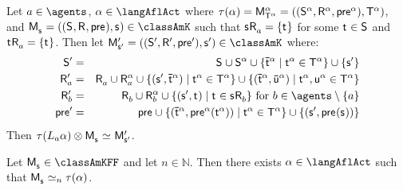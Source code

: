 \begin{lemma}\label{afl-kff-construction-learning}
Let $\agentA \in \agents$, $\alpha \in \langAflAct$ where $\tau(\alpha) = \aPModel[\alpha]{\aStatesT[\alpha]} = \aPModelTuple[\alpha]{\aStatesT[\alpha]}$, and $\aPModel{\aStateS} = \aPModelTuple{\aStateS} \in \classAmK$ such that $\aStateS \aAccessibility{\agentA} = \{\aStateT\}$ for some $\aStateT \in \aStates$ and $\aStateT \aAccessibility{\agentA} = \{\aStateT\}$.
Then let $\aPModel[\prime]{\aStateS[\prime]} = \aPModelTuple[\prime]{\aStateS[\prime]} \in \classAmK$ where:
\begin{eqnarray*}
    \aStates[\prime] &=& \aStates \cup \aStates[\alpha] \cup \{\aPStateT[\alpha] \mid \aStateT[\alpha] \in \aStatesT[\alpha]\} \cup \{\aStateS[\prime]\}\\
    \aAccessibility[\prime]{\agentA} &=& \aAccessibility{\agentA} \cup \aAccessibility[\alpha]{\agentA} \cup \{(\aStateS[\prime], \aPStateT[\alpha]) \mid \aStateT[\alpha] \in \aStatesT[\alpha]\} \cup \{(\aPStateT[\alpha], \aPStateU[\alpha]) \mid \aStateT[\alpha], \aStateU[\alpha] \in \aStatesT[\alpha]\}\\
    \aAccessibility[\prime]{\agentB} &=& \aAccessibility{\agentB} \cup \aAccessibility[\alpha]{\agentB} \cup \{(\aStateS[\prime], \aStateT) \mid \aStateT \in \aStateS \aAccessibility{\agentB}\} \text{ for } \agentB \in \agents \setminus \{\agentA\}\\
    \aPrecondition[\prime] &=& \aPrecondition \cup \{(\aPStateT[\alpha], \aPrecondition[\alpha](\aStateT[\alpha])) \mid \aStateT[\alpha] \in \aStatesT[\alpha]\} \cup \{(\aStateS[\prime], \aPrecondition(\aStateS))\}
\end{eqnarray*}
Then $\tau(\learns_\agentA \alpha) \exec \aPModel{\aStateS} \bisimilar \aPModel[\prime]{\aStateS[\prime]}$.
\end{lemma}

\begin{proposition}\label{afl-kff-correspondence}
Let $\aPModel{\aStateS} \in \classAmKFF$ and let $n \in \mathbb{N}$. 
Then there exists $\alpha \in \langAflAct$ such that $\aPModel{\aStateS} \bisimilar[n] \tau(\alpha)$.
\end{proposition}

